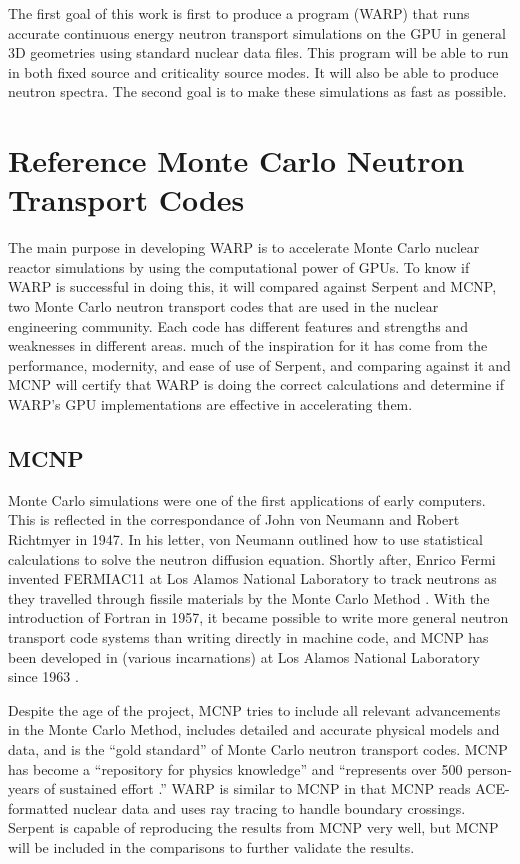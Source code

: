 The first goal of this work is first to produce a program (WARP) that runs accurate continuous energy neutron transport simulations on the GPU in general 3D geometries using standard nuclear data files.  This program will be able to run in both fixed source and criticality source modes.  It will also be able to produce neutron spectra.  The second goal is to make these simulations as fast as possible.

\section{Reference Monte Carlo Neutron Transport Codes}

The main purpose in developing WARP is to accelerate Monte Carlo nuclear reactor simulations by using the computational power of GPUs.  To know if WARP is successful in doing this, it will compared against Serpent and MCNP, two Monte Carlo neutron transport codes that are used in the nuclear engineering community.  Each code has different features and strengths and weaknesses in different areas.  much of the inspiration for it has come from the performance, modernity, and ease of use of Serpent, and comparing against it and MCNP will certify that WARP is doing the correct calculations and determine if WARP's GPU implementations are effective in accelerating them.  

\subsection{MCNP}

Monte Carlo simulations were one of the first applications of early computers.   This is reflected in the correspondance of John von Neumann and  Robert Richtmyer  in 1947.  In his letter, von Neumann outlined how to use statistical calculations to solve the neutron diffusion equation.  Shortly after, Enrico Fermi invented FERMIAC11 at Los Alamos National Laboratory to track neutrons as they travelled through fissile materials by the Monte Carlo Method \cite{mcnp}.  With the introduction of Fortran in 1957, it became possible to write more general neutron transport code systems than writing directly in machine code, and MCNP has been developed in (various incarnations) at Los Alamos National Laboratory since 1963 \cite{mcnp}.
 
Despite the age of the project, MCNP tries to include all relevant advancements in the Monte Carlo Method, includes detailed and accurate physical models and data, and is the ``gold standard'' of Monte Carlo neutron transport codes.  MCNP has become a ``repository for physics knowledge'' and ``represents over 500 person-years of sustained effort \cite{mcnp}.''   WARP is similar to MCNP in that MCNP reads ACE-formatted nuclear data and uses ray tracing to handle boundary crossings.  Serpent is capable of reproducing the results from MCNP very well, but MCNP will be included in the comparisons to further validate the results.

